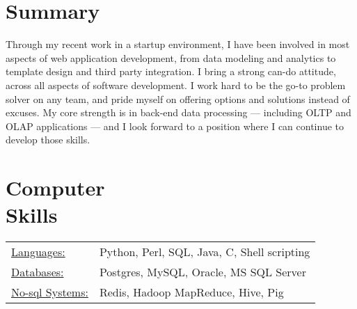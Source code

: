 \documentclass[margin]{res}
\begin{document}

\address{1404 Duckwall Road \\ Berkeley Springs, WV 25411  \\
(917) 678 3636 \\
\href{mailto:mark.tozzi@gmail.com}{mark.tozzi@gmail.com}
$\bullet$ \href{https://github.com/not-napoleon}{github: not-napoleon}
$\bullet$ \href{https://twitter.com/not_napoleon}{twitter: not\_napoleon} }


\begin{resume}

\section{Summary}
Through my recent work in a startup environment, I have been involved in most
aspects of web application development, from data modeling and analytics
to template design and third party integration. I bring a strong can-do
attitude, across all aspects of software development. I work hard to
be the go-to problem solver on any team, and pride myself on offering options
and solutions instead of excuses. My core strength is in back-end data
processing --- including OLTP and OLAP applications --- and I look forward to a
position where I can continue to develop those skills.

\section{Computer \\ Skills}
   \begin{tabular}{l p{3in}}
     \underline{Languages:} & Python, Perl, SQL, Java, C, Shell scripting\\
     \underline{Databases:} & Postgres, MySQL, Oracle, MS SQL Server \\
     \underline{No-sql Systems:} & Redis, Hadoop MapReduce, Hive, Pig
   \end{tabular}


\end{resume}
\end{document}
